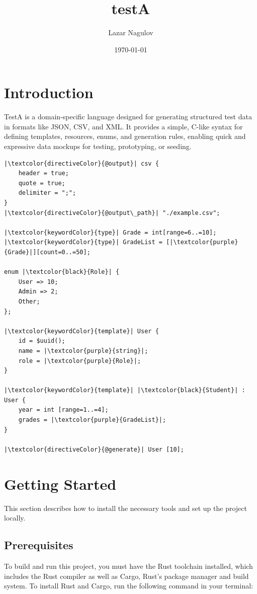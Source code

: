 \documentclass[11pt,a4paper]{article}
\author{Lazar Nagulov}
\title{testA}
\date{\today}
\begin{document}
    
    \maketitle
    \newpage
    \tableofcontents
    \newpage
    
    \section{Introduction}
    TestA is a domain-specific language designed for generating structured 
    test data in formats like JSON, CSV, and XML. It provides a simple, 
    C-like syntax for defining templates, resources, enums, and generation
    rules, enabling quick and expressive data mockups for testing, prototyping, 
    or seeding.
    \begin{listing}[h]
    \begin{verbatim}
|\textcolor{directiveColor}{@output}| csv {
    header = true;
    quote = true;
    delimiter = ";";
}
|\textcolor{directiveColor}{@output\_path}| "./example.csv";

|\textcolor{keywordColor}{type}| Grade = int[range=6..=10];
|\textcolor{keywordColor}{type}| GradeList = [|\textcolor{purple}{Grade}|][count=0..=50];

enum |\textcolor{black}{Role}| { 
    User => 10; 
    Admin => 2;
    Other;
};

|\textcolor{keywordColor}{template}| User {
    id = $uuid();
    name = |\textcolor{purple}{string}|;
    role = |\textcolor{purple}{Role}|;
}

|\textcolor{keywordColor}{template}| |\textcolor{black}{Student}| : User {
    year = int [range=1..=4];
    grades = |\textcolor{purple}{GradeList}|;
}

|\textcolor{directiveColor}{@generate}| User [10];
    \end{verbatim}
    \centering
    \caption{testA example}
    \label{listing:example}
    \end{listing}
    \newpage

    \section{Getting Started}
    This section describes how to install the necessary tools and set up the 
    project locally.

    \subsection{Prerequisites}
    To build and run this project, you must have the Rust toolchain installed,
    which includes the Rust compiler as well as Cargo, Rust's package manager 
    and build system. To install Rust and Cargo, run the following command in 
    your terminal:
\end{document}

